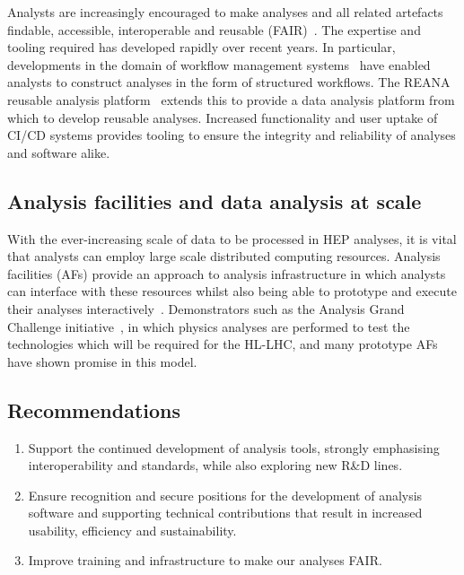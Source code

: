 \documentclass[10pt,a4paper]{article}
\begin{document}
Analysts are increasingly encouraged to make analyses and all related artefacts
findable, accessible, interoperable and reusable
(FAIR)~\cite{wilkinson_fair_2016, Chen_2022, Duarte:2022job, FAIR4AIWorkshop}. The
expertise and tooling required has developed rapidly over recent years. In
particular, developments in the domain of workflow management
systems~\cite{cwl,snakemake,luigilaw,yadage} have enabled analysts to construct
analyses in the form of structured workflows. The REANA reusable analysis
platform~\cite{REANA} extends this to provide a data analysis platform from
which to develop reusable analyses. Increased functionality and user uptake of
CI/CD systems provides tooling to ensure the integrity and reliability of
analyses and software alike.

\subsection{Analysis facilities and data analysis at
scale}\label{analysis-facilities-and-data-analysis-at-scale}

With the ever-increasing scale of data to be processed in HEP analyses, it is
vital that analysts can employ large scale distributed computing resources.
Analysis facilities (AFs) provide an approach to analysis infrastructure in
which analysts can interface with these resources whilst also being able to
prototype and execute their analyses interactively~\cite{WLCG:ana_fac_wp}. Demonstrators
such as the Analysis Grand Challenge
initiative~\cite{Held:2022RC}, in which physics analyses
are performed to test the technologies which will be required for the HL-LHC,
and many prototype AFs have shown promise in this model.

\subsection{Recommendations}\label{recommendations-3}

\begin{enumerate}
\def\labelenumi{\arabic{enumi}.}
\item
  Support the continued development of analysis tools, strongly
  emphasising interoperability and standards, while also exploring new
  R\&D lines.
\item
  Ensure recognition and secure positions for the development of
  analysis software and supporting technical contributions that
  result in increased usability, efficiency and sustainability.
\item
  Improve training and infrastructure to make our analyses FAIR.
\end{enumerate}
\end{document}
